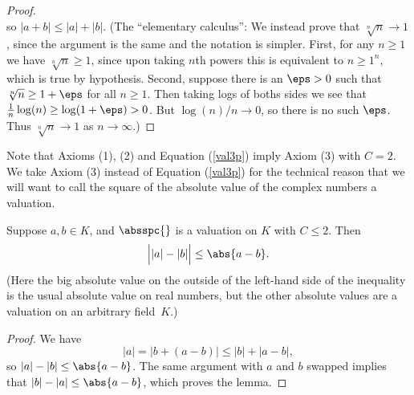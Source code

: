 \documentclass[11pt]{book}
\begin{document}
\begin{ch}
\begin{proof}
$$$$ so $|a+b| \leq |a|+|b|$.
(The ``elementary calculus'': We instead prove that $\sqrt[n]{n}\to 1$, since
the argument is the same and the notation is simpler.  First, for any
$n\geq 1$ we have $\sqrt[n]{n}\geq 1$, since upon taking $n$th powers
this is equivalent to $n\geq 1^n$, which is true by hypothesis.
Second, suppose there is an $\eps>0$ such that $\sqrt[n]{n}\geq
1+\eps$ for all $n\geq 1$.  Then taking logs of boths sides we see
that $\frac{1}{n}\log(n)\geq \log(1+\eps) > 0$.  But
 $\log(n)/n\to 0$, so there is no such $\eps$.  Thus
$\sqrt[n]{n}\to 1$ as $n\to \infty$.)
\end{proof}
Note that Axioms (1), (2) and Equation (\ref{val3p}) imply Axiom (3)
with $C=2$.  We take Axiom (3) instead of Equation (\ref{val3p}) for
the technical reason that we will want to call the square of the
absolute value of the complex numbers a valuation.

\begin{lemma}
Suppose $a, b \in K$, and $\absspc{}$ is a valuation on $K$
with $C\leq 2$.
Then
$$
  \Bigl||a| - |b|\Bigr| \leq \abs{a-b}.
$$
(Here the big absolute value on the outside of the left-hand
side of the inequality is the usual absolute value on
real numbers, but the other absolute values are a valuation
on an arbitrary field~$K$.)
\end{lemma}
\begin{proof}
We have
$$|a| = |b + (a-b)| \leq |b| + |a-b|,$$
so $|a|-|b|\leq \abs{a-b}$.  The same argument
with $a$ and $b$ swapped implies that
$|b|-|a|\leq \abs{a-b}$, which proves the lemma.
\end{proof}



\end{ch}
\end{document}
